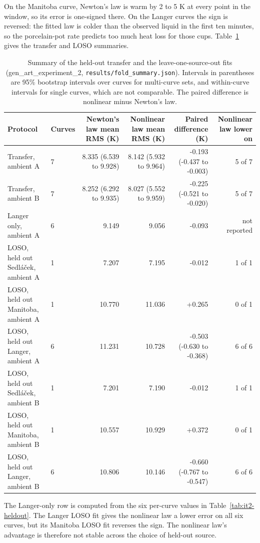 \documentclass[11pt,letterpaper]{article}
\begin{document}
On the Manitoba curve, Newton's law is warm by 2 to 5 K at every point in the window, so its error is one-signed there. On the Langer curves the sign is reversed: the fitted law is colder than the observed liquid in the first ten minutes, so the porcelain-pot rate predicts too much heat loss for those cups. Table~\ref{tab:it2-summary} gives the transfer and LOSO summaries.

\begin{table}[!htbp]
\centering
\small
\caption{Summary of the held-out transfer and the leave-one-source-out fits (gen\_art\_experiment\_2, \texttt{results/fold\_summary.json}). Intervals in parentheses are 95\% bootstrap intervals over curves for multi-curve sets, and within-curve intervals for single curves, which are not comparable. The paired difference is nonlinear minus Newton's law.}
\label{tab:it2-summary}
\begin{tabularx}{\linewidth}{p{4.0cm}p{1.3cm}rrrr}
\toprule
Protocol & Curves & Newton's law mean RMS (K) & Nonlinear law mean RMS (K) & Paired difference (K) & Nonlinear law lower on \\
\midrule
Transfer, ambient A & 7 & 8.335 (6.539 to 9.928) & 8.142 (5.932 to 9.964) & -0.193 (-0.437 to -0.003) & 5 of 7 \\
Transfer, ambient B & 7 & 8.252 (6.292 to 9.935) & 8.027 (5.552 to 9.959) & -0.225 (-0.521 to -0.020) & 5 of 7 \\
Langer only, ambient A & 6 & 9.149 & 9.056 & -0.093 & not reported \\
LOSO, held out Sedl\'{a}\v{c}ek, ambient A & 1 & 7.207 & 7.195 & -0.012 & 1 of 1 \\
LOSO, held out Manitoba, ambient A & 1 & 10.770 & 11.036 & +0.265 & 0 of 1 \\
LOSO, held out Langer, ambient A & 6 & 11.231 & 10.728 & -0.503 (-0.630 to -0.368) & 6 of 6 \\
LOSO, held out Sedl\'{a}\v{c}ek, ambient B & 1 & 7.201 & 7.190 & -0.012 & 1 of 1 \\
LOSO, held out Manitoba, ambient B & 1 & 10.557 & 10.929 & +0.372 & 0 of 1 \\
LOSO, held out Langer, ambient B & 6 & 10.806 & 10.146 & -0.660 (-0.767 to -0.547) & 6 of 6 \\
\bottomrule
\end{tabularx}
\end{table}

The Langer-only row is computed from the six per-curve values in Table~\ref{tab:it2-heldout}. The Langer LOSO fit gives the nonlinear law a lower error on all six curves, but its Manitoba LOSO fit reverses the sign. The nonlinear law's advantage is therefore not stable across the choice of held-out source.
\end{document}

